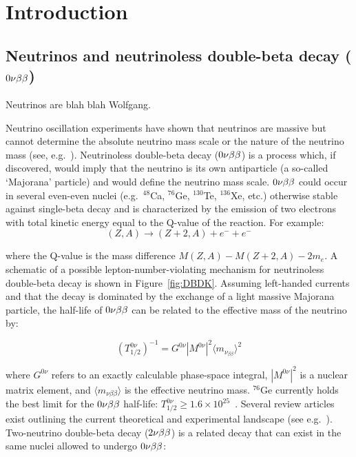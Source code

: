 
\chapter{Introduction}
	\label{chap:IntroChapter}

	\section{Neutrinos and neutrinoless double-beta decay ($0 \nu \beta \beta$)}
	
	Neutrinos are blah blah Wolfgang.  
	
	  Neutrino oscillation experiments have shown that neutrinos are massive but
cannot determine the absolute neutrino mass scale or the nature of the neutrino
mass (see, e.g.~\cite{Mes04}).  Neutrinoless double-beta decay ($0 \nu \beta \beta$) is a
process which, if discovered, would imply that the neutrino is its own
antiparticle (a so-called `Majorana' particle) and would define the neutrino
mass scale.  $0 \nu \beta \beta$ could occur in several even-even nuclei (e.g.~$^{48}$Ca,
$^{76}$Ge, $^{130}$Te, $^{136}$Xe, etc.) otherwise stable against
single-beta decay and is characterized by the emission of two electrons with
total kinetic energy equal to the Q-value of the reaction.  For example:
\begin{equation}
(Z,A) \rightarrow (Z+2,A) + e^- + e^-
\end{equation} 

where the Q-value is the mass difference $M(Z,A)-M(Z+2,A)-2m_e$.
A schematic of a possible lepton-number-violating mechanism for neutrinoless double-beta
decay is shown in Figure~\ref{fig:DBDK}.  Assuming left-handed currents and
that the decay is dominated by the exchange of a light massive Majorana
particle, the half-life of $0 \nu \beta \beta$ can be related to the effective mass of
the neutrino by:

\begin{equation}
\left( T_{1/2}^{0\nu}\right)^{-1} = G^{0\nu} |M^{0\nu}|^2 \langle m_{\nu_{\beta\beta}} \rangle^2  
\end{equation} 

where $G^{0\nu}$ refers to an exactly calculable phase-space integral, 
$|M^{0\nu}|^2$ is a nuclear matrix element, and $\langle m_{\nu{\beta\beta}}\rangle$
is the effective neutrino mass.  $^{76}$Ge currently holds the best limit for
the $0 \nu \beta \beta$ half-life: $T^{0\nu}_{1/2}\geq 1.6\times10^{25}$~\cite{Bau99}.
Several review articles exist outlining the current theoretical and
experimental landscape (see e.g.~\cite{Ell02,Bara07}).  
Two-neutrino double-beta decay ($2 \nu \beta \beta$) is a related 
decay that can exist in the same nuclei allowed to undergo $0 \nu \beta \beta$:  

